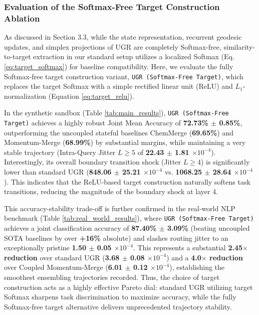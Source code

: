 \subsubsection{Evaluation of the Softmax-Free Target Construction Ablation}
As discussed in Section 3.3, while the state representation, recurrent geodesic updates, and simplex projections of UGR are completely Softmax-free, similarity-to-target extraction in our standard setup utilizes a localized Softmax (Eq. \ref{eq:target_softmax}) for baseline compatibility. Here, we evaluate the fully Softmax-free target construction variant, \texttt{UGR (Softmax-Free Target)}, which replaces the target Softmax with a simple rectified linear unit (ReLU) and $L_1$-normalization (Equation \ref{eq:target_relu}).

In the synthetic sandbox (Table \ref{tab:main_results}), \texttt{UGR (Softmax-Free Target)} achieves a highly robust Joint Mean Accuracy of \textbf{72.73\% $\pm$ 0.85\%}, outperforming the uncoupled stateful baselines ChemMerge (\textbf{69.65\%}) and Momentum-Merge (\textbf{68.99\%}) by substantial margins, while maintaining a very stable trajectory (Intra-Query Jitter $L \ge 5$ of \textbf{22.43 $\pm$ 1.81 $\times 10^{-4}$}). Interestingly, its overall boundary transition shock (Jitter $L \ge 4$) is significantly lower than standard UGR (\textbf{848.06 $\pm$ 25.21 $\times 10^{-4}$} vs. \textbf{1068.25 $\pm$ 28.64 $\times 10^{-4}$}). This indicates that the ReLU-based target construction naturally softens task transitions, reducing the magnitude of the boundary shock at layer 4.

This accuracy-stability trade-off is further confirmed in the real-world NLP benchmark (Table \ref{tab:real_world_results}), where \texttt{UGR (Softmax-Free Target)} achieves a joint classification accuracy of \textbf{87.40\% $\pm$ 3.09\%} (beating uncoupled SOTA baselines by over \textbf{+16\%} absolute) and slashes routing jitter to an exceptionally pristine \textbf{1.50 $\pm$ 0.05 $\times 10^{-4}$}. \mdseries This represents a substantial \textbf{2.45$\times$ reduction} over standard UGR (\textbf{3.68 $\pm$ 0.08 $\times 10^{-4}$}) and a \textbf{4.0$\times$ reduction} over Coupled Momentum-Merge (\textbf{6.01 $\pm$ 0.12 $\times 10^{-4}$}), establishing the smoothest ensembling trajectories recorded. Thus, the choice of target construction acts as a highly effective Pareto dial: standard UGR utilizing target Softmax sharpens task discrimination to maximize accuracy, while the fully Softmax-free target alternative delivers unprecedented trajectory stability.

